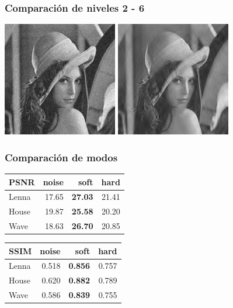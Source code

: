\documentclass{beamer}
\begin{document}
  \begin{frame}
    \frametitle{Comparación de niveles 2 - 6}
    \centering
    \includegraphics[width=5cm]{imgs/Levels/2_normal_soft_sym8_Lenna.jpg}  
    \includegraphics[width=5cm]{imgs/Levels/6_normal_soft_sym8_Lenna.jpg}
  
  \end{frame}

  \begin{frame}
    \frametitle{ Comparación de modos }
    \centering
    \begin{tabular}{lrrr}
      \toprule
      {PSNR} &  noise &   soft &   hard \\
      \midrule
      Lenna &  17.65 &  \bf{27.03} &  21.41 \\
      House &  19.87 &  \bf{25.58} &  20.20 \\
      Wave &  18.63 &  \bf{26.70} &  20.85 \\
      \bottomrule
      \end{tabular}
      \begin{tabular}{lrrr}
        {SSIM} &  noise &   soft &   hard \\
        \midrule
        Lenna &  0.518 &  \bf{0.856} &  0.757 \\
        House &  0.620 &  \bf{0.882} &  0.789 \\
        Wave &  0.586 &  \bf{0.839} &  0.755 \\
        \bottomrule
        \end{tabular}

  \end{frame}
\end{document}
